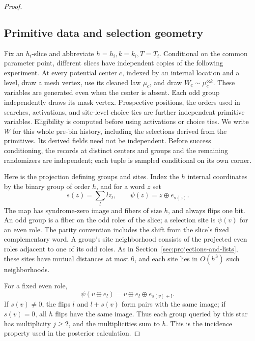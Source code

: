\begin{proof}\leavevmode\par
\subsection{Primitive data and selection geometry}
\label{sec:internal-primitive-data}

Fix an \(h_i\)-slice and abbreviate \(h=h_i,k=k_i,T=T_i\). Conditional on the common parameter point, different slices have independent copies of the following experiment. At every potential center \(c\), indexed by an internal location and a level, draw a mesh vertex, use its cleaned law \(\mu_c\), and draw \(W_c\sim\mu_c^{\otimes k}\). These variables are generated even when the center is absent. Each odd group independently draws its mask vertex. Prospective positions, the orders used in searches, activations, and site-level choice ties are further independent primitive variables. Eligibility is computed before using activations or choice ties. We write \(W\) for this whole pre-bin history, including the selections derived from the primitives. Its derived fields need not be independent. Before success conditioning, the records at distinct centers and groups and the remaining randomizers are independent; each tuple is sampled conditional on its own corner.

Here is the projection defining groups and sites. Index the \(h\) internal coordinates by the binary group of order \(h\), and for a word \(z\) set
\[
 s(z)=\sum_l lz_l,\qquad \psi(z)=z\oplus e_{s(z)}.
\]
The map has syndrome-zero image and fibers of size \(h\), and always flips one bit. An odd group is a fiber on the odd roles of the slice; a selection site is \(\psi(v)\) for an even role. The parity convention includes the shift from the slice's fixed complementary word. A group's site neighborhood consists of the projected even roles adjacent to one of its odd roles. As in Section~\ref{sec:projections-and-lists}, these sites have mutual distances at most 6, and each site lies in \(O(h^3)\) such neighborhoods.

For a fixed even role,
\[
 \psi(v\oplus e_l)=v\oplus e_l\oplus e_{s(v)+l}.
\]
If \(s(v)\ne0\), the flips \(l\) and \(l+s(v)\) form pairs with the same image; if \(s(v)=0\), all \(h\) flips have the same image. Thus each group queried by this star has multiplicity \(j\ge2\), and the multiplicities sum to \(h\). This is the incidence property used in the posterior calculation.


\end{proof}
